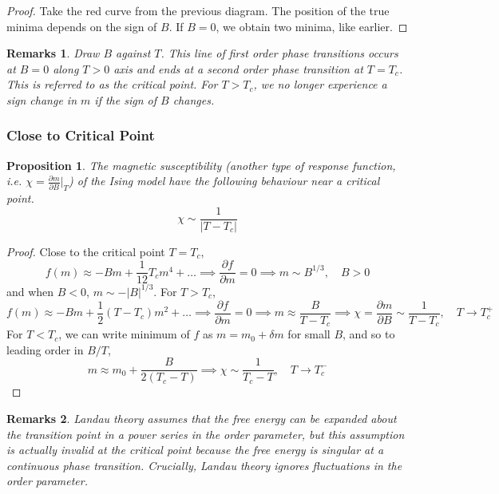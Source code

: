 \documentclass[a4paper]{article}
\newtheorem{remarks}{Remarks}[section]
\theoremstyle{new}
\newtheorem{prop}{Proposition}[section]
\begin{document}
\begin{proof}
Take the red curve from the previous diagram. The position of the true minima depends on the sign of $B$. If $B=0$, we obtain two minima, like earlier.
\end{proof}
\begin{remarks}
Draw $B$ against $T$. This line of first order phase transitions occurs at $B=0$ along $T>0$ axis and ends at a second order phase transition at $T = T_c$. This is referred to as the critical point. For $T>T_c$, we no longer experience a sign change in $m$ if the sign of $B$ changes.
\end{remarks}
\subsubsection*{Close to Critical Point}
\begin{prop}
The magnetic susceptibility (another type of response function, i.e. $\chi=\frac{\partial m}{\partial B}|_T$) of the Ising model have the following behaviour near a critical point.
$$\chi\sim\frac{1}{|T-T_c|}$$
\end{prop}
\begin{proof}
Close to the critical point $T=T_c$,
$$f(m)\approx-Bm+\frac{1}{12}T_cm^4+\dots\implies \frac{\partial f}{\partial m}=0\implies m\sim B^{1/3},\quad B>0$$
and when $B<0$, $m\sim-|B|^{1/3}$. For $T>T_c$,
$$f(m)\approx-Bm+\frac{1}{2}(T-T_c)m^2+\dots\implies \frac{\partial f}{\partial m}=0\implies m\approx\frac{B}{T-T_c}\implies\chi=\frac{\partial m}{\partial B}\sim\frac{1}{T-T_c},\quad T\rightarrow T_c^+$$
For $T<T_c$, we can write minimum of $f$ as $m=m_0+\delta m$ for small $B$, and so to leading order in $B/T$, 
$$m\approx m_0+\frac{B}{2(T_c-T)}\implies\chi\sim\frac{1}{T_c-T},\quad T\rightarrow T_c^-$$
\end{proof}
\begin{remarks}
Landau theory assumes that the free energy can be expanded about the transition point in a power series in the order parameter, but this assumption is actually invalid at the critical point because the free energy is singular at a continuous phase transition. Crucially, Landau theory ignores fluctuations in the order parameter.
\end{remarks}
\newpage
\end{document}
